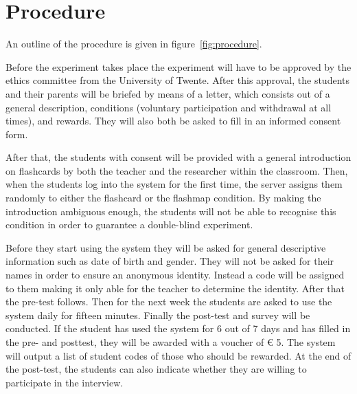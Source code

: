 \section{Procedure}



An outline of the procedure is given in figure~\ref{fig:procedure}.

Before the experiment takes place the experiment will have to be approved by the ethics committee from the University of Twente. After this approval, the students and their parents will be briefed by means of a letter, which consists out of a general description, conditions (voluntary participation and withdrawal at all times), and rewards. They will also both be asked to fill in an informed consent form.

After that, the students with consent will be provided with a general introduction on flashcards by both the teacher and the researcher within the classroom. Then, when the students log into the system for the first time, the server assigns them randomly to either the flashcard or the flashmap condition. By making the introduction ambiguous enough, the students will not be able to recognise this condition in order to guarantee a double-blind experiment.

Before they start using the system they will be asked for general descriptive information such as date of birth and gender. They will not be asked for their names in order to ensure an anonymous identity. Instead a code will be assigned to them making it only able for the teacher to determine the identity. After that the pre-test follows. Then for the next week the students are asked to use the system daily for fifteen minutes. Finally the post-test and survey will be conducted. If the student has used the system for 6 out of 7 days and has filled in the pre- and posttest, they will be awarded with a voucher of \euro{} 5. The system will output a list of student codes of those who should be rewarded. At the end of the post-test, the students can also indicate whether they are willing to participate in the interview.

